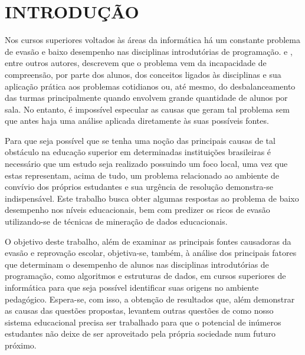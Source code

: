 % 
%


\chapter{INTRODUÇÃO}
\label{chap:introducao}
Nos cursos superiores voltados às áreas da informática há um constante problema de evasão e baixo desempenho nas disciplinas introdutórias de programação.   e , entre outros autores, descrevem que o problema vem da incapacidade de compreensão, por parte dos alunos, dos conceitos ligados às disciplinas e sua aplicação prática aos problemas cotidianos ou, até mesmo, do desbalanceamento das turmas principalmente quando envolvem grande quantidade de alunos por sala. No entanto, é impossível especular as causas que geram tal problema sem que antes haja uma análise aplicada diretamente às suas possíveis fontes. 

Para que seja possível que se tenha uma noção das principais causas de tal obstáculo na educação superior em determinadas instituições brasileiras é necessário que um estudo seja realizado possuindo um foco local, uma vez que estas representam, acima de tudo, um problema relacionado ao ambiente de convívio dos próprios estudantes e sua urgência de resolução demonstra-se indispensável. Este trabalho busca obter algumas respostas ao problema de baixo desempenho nos níveis educacionais, bem com predizer os ricos de evasão utilizando-se de técnicas de mineração de dados educacionais.

O objetivo deste trabalho, além de examinar as principais fontes causadoras da evasão e reprovação escolar, objetiva-se, também, à análise dos principais fatores que determinam o desempenho de alunos nas disciplinas introdutórias de programação, como algoritmos e estruturas de dados, em cursos superiores de informática para que seja possível identificar suas origens no ambiente pedagógico. Espera-se, com isso, a obtenção de resultados que, além demonstrar as causas das questões propostas, levantem outras questões de como nosso sistema educacional precisa ser trabalhado para que o potencial de inúmeros estudantes não deixe de ser aproveitado pela própria sociedade num futuro próximo.

